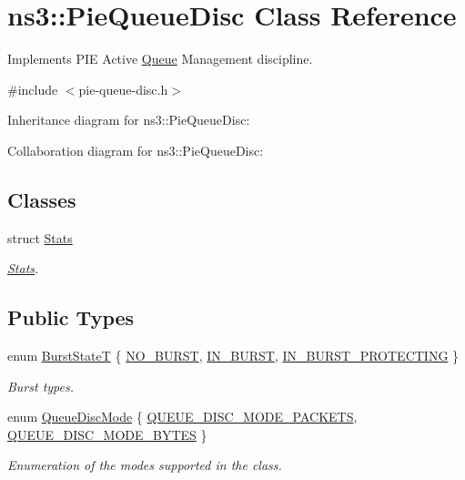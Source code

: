 \hypertarget{classns3_1_1PieQueueDisc}{}\section{ns3\+:\+:Pie\+Queue\+Disc Class Reference}
\label{classns3_1_1PieQueueDisc}


Implements P\+IE Active \hyperlink{classns3_1_1Queue}{Queue} Management discipline.  




{\ttfamily \#include $<$pie-\/queue-\/disc.\+h$>$}



Inheritance diagram for ns3\+:\+:Pie\+Queue\+Disc\+:


Collaboration diagram for ns3\+:\+:Pie\+Queue\+Disc\+:
\subsection*{Classes}
\begin{DoxyCompactItemize}
\item 
struct \hyperlink{structns3_1_1PieQueueDisc_1_1Stats}{Stats}
\begin{DoxyCompactList}\small\item\em \hyperlink{structns3_1_1PieQueueDisc_1_1Stats}{Stats}. \end{DoxyCompactList}\end{DoxyCompactItemize}
\subsection*{Public Types}
\begin{DoxyCompactItemize}
\item 
enum \hyperlink{classns3_1_1PieQueueDisc_ad1530234d55d1552449983fd84b27d55}{Burst\+StateT} \{ \hyperlink{classns3_1_1PieQueueDisc_ad1530234d55d1552449983fd84b27d55a5cce554d5491506da1d9a2428d9428cc}{N\+O\+\_\+\+B\+U\+R\+ST}, 
\hyperlink{classns3_1_1PieQueueDisc_ad1530234d55d1552449983fd84b27d55afd3dea8d61f2b624fa8e9688c816a260}{I\+N\+\_\+\+B\+U\+R\+ST}, 
\hyperlink{classns3_1_1PieQueueDisc_ad1530234d55d1552449983fd84b27d55a54940181d552d15677b05bd8b29f2c77}{I\+N\+\_\+\+B\+U\+R\+S\+T\+\_\+\+P\+R\+O\+T\+E\+C\+T\+I\+NG}
 \}\begin{DoxyCompactList}\small\item\em Burst types. \end{DoxyCompactList}
\item 
enum \hyperlink{classns3_1_1PieQueueDisc_af026730ff1c04dd9bdf74b1797ae2ac4}{Queue\+Disc\+Mode} \{ \hyperlink{classns3_1_1PieQueueDisc_af026730ff1c04dd9bdf74b1797ae2ac4af556e8533dede431ff4553fe631883dc}{Q\+U\+E\+U\+E\+\_\+\+D\+I\+S\+C\+\_\+\+M\+O\+D\+E\+\_\+\+P\+A\+C\+K\+E\+TS}, 
\hyperlink{classns3_1_1PieQueueDisc_af026730ff1c04dd9bdf74b1797ae2ac4a7912e4d0abe5d772d04d327880734539}{Q\+U\+E\+U\+E\+\_\+\+D\+I\+S\+C\+\_\+\+M\+O\+D\+E\+\_\+\+B\+Y\+T\+ES}
 \}\begin{DoxyCompactList}\small\item\em Enumeration of the modes supported in the class. \end{DoxyCompactList}
\end{DoxyCompactItemize}

